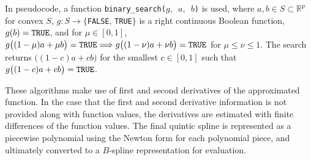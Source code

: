 \documentclass{scspaperproc}
\theoremstyle{scsthe}
\begin{document}
In pseudocode, a function \texttt{binary\_search($g,$ $a,$ $b$)} is used, where $a,b\in S\subset \mathbb{R}^p$ for convex $S$, $g: S \rightarrow \{$\texttt{FALSE}, \texttt{TRUE}$\}$ is a right continuous Boolean function, $g(b) = \hbox{\texttt{TRUE}}$, and for $\mu \in [0,1]$, $g\big((1-\mu)a + \mu b\big) =\hbox{\texttt{TRUE}} \Longrightarrow g\big((1-\nu)a + \nu b\big) =\hbox{\texttt{TRUE}}$ for $\mu \le \nu\le1$. The search returns $\big((1-c)a + c b\big)$ for the smallest $c \in [0,1]$ such that $g\big((1-c)a + c b\big) = \hbox{\texttt{TRUE}}$.

These algorithms make use of first and second derivatives of the approximated function. In the case that the first and second derivative information is not provided along with function values, the derivatives are estimated with finite differences of the function values. The final quintic spline is represented as a piecewise polynomial using the Newton form for each polynomial piece, and ultimately converted to a $B$-spline representation for evaluation.
\end{document}
